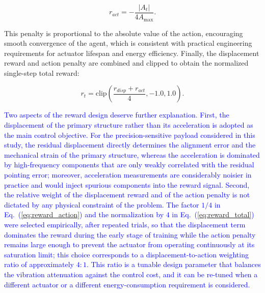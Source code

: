 \documentclass[review]{elsarticle}
\begin{document}
\begin{equation}\label{eq:reward_action}
{r}_{act}=-\frac{|{A}_{t}|}{4{A}_{\max }}.
\end{equation}

\noindent This penalty is proportional to the absolute value of the action, encouraging smooth convergence of the agent, which is consistent with practical engineering requirements for actuator lifespan and energy efficiency. Finally, the displacement reward and action penalty are combined and clipped to obtain the normalized single-step total reward:

\begin{equation}\label{eq:reward_total}
r_t = \text{clip} \left( \frac{r_{disp} + r_{act}}{4}, -1.0, 1.0 \right).
\end{equation}

\textcolor{blue}{Two aspects of the reward design deserve further explanation. First, the displacement of the primary structure rather than its acceleration is adopted as the main control objective. For the precision-sensitive payload considered in this study, the residual displacement directly determines the alignment error and the mechanical strain of the primary structure, whereas the acceleration is dominated by high-frequency components that are only weakly correlated with the residual pointing error; moreover, acceleration measurements are considerably noisier in practice and would inject spurious components into the reward signal. Second, the relative weight of the displacement reward and of the action penalty is not dictated by any physical constraint of the problem. The factor $1/4$ in Eq.~(\ref{eq:reward_action}) and the normalization by $4$ in Eq.~(\ref{eq:reward_total}) were selected empirically, after repeated trials, so that the displacement term dominates the reward during the early stage of training while the action penalty remains large enough to prevent the actuator from operating continuously at its saturation limit; this choice corresponds to a displacement-to-action weighting ratio of approximately $4\!:\!1$. This ratio is a tunable design parameter that balances the vibration attenuation against the control cost, and it can be re-tuned when a different actuator or a different energy-consumption requirement is considered.}
\end{document}
